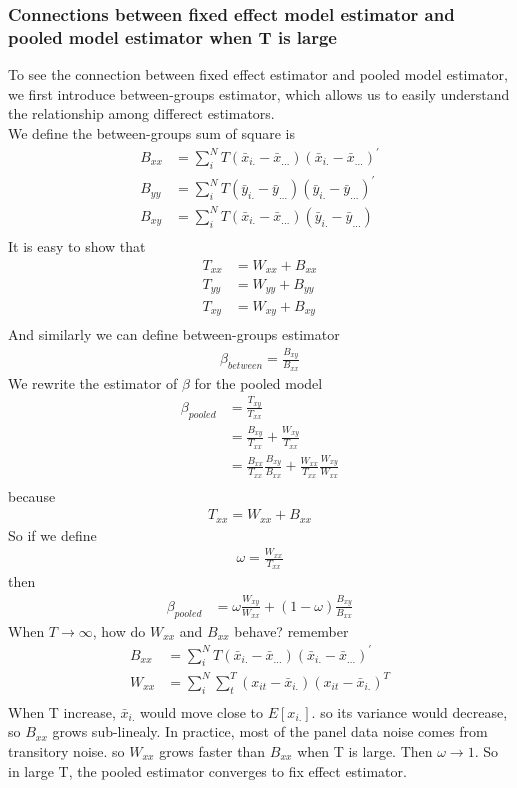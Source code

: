 \documentclass[a4paper]{article}
\begin{document}
\subsubsection {Connections between fixed effect model estimator and pooled model estimator when T is large}
To see the connection between fixed effect estimator and pooled model estimator, we first introduce between-groups estimator, which allows us to easily understand the relationship among differect estimators.\\
We define the between-groups sum of square is
\begin{align*}
B_{xx} & = \sum_i^NT(\bar x_{i.}-\bar x_{...})(\bar x_{i.}-\bar x_{...})^{'} \\
B_{yy} &= \sum_i^NT(\bar y_{i.}-\bar y_{...})(\bar y_{i.}-\bar y_{...})^{'}\\
B_{xy} &= \sum_i^NT(\bar x_{i.}-\bar x_{...})(\bar y_{i.}-\bar y_{...})\\
\end{align*}
It is easy to show that 
\begin{align*}
T_{xx} &= W_{xx} + B_{xx} \\
T_{yy} &= W_{yy} + B_{yy} \\
T_{xy} &= W_{xy} + B_{xy} \\
\end{align*}
And similarly we can define between-groups estimator
\begin{align*}
\beta_{between} = \frac{B_{xy}}{B_{xx}}
\end{align*}
We rewrite the  estimator of $\beta$ for the pooled model 
\begin{align*}
\beta_{pooled} & = \frac{T_{xy}}{T_{xx}} \\
                      & = \frac{B_{xy}}{T_{xx}} + \frac{W_{xy}}{T_{xx}}\\
                      & = \frac{B_{xx}}{T_{xx}}\frac{B_{xy}}{B_{xx}}  +  \frac{W_{xx}}{T_{xx}} \frac{W_{xy}}{W_{xx}} \\
\end{align*}
because
\begin{align*}
T_{xx} = W_{xx} + B_{xx}
\end{align*}
So if we define 
\begin{align*}
\omega = \frac{W_{xx}}{T_{xx}}
\end{align*}
then 
\begin{align*}
\beta_{pooled} & = \omega \frac{W_{xy}}{W_{xx}}+ (1 - \omega) \frac {B_{xy}}{B_{xx}} 
\end{align*}
When $T \rightarrow \infty$, how do $W_{xx}$ and $B_{xx}$ behave? remember
\begin{align*}
B_{xx} & = \sum_i^NT(\bar x_{i.}-\bar x_{...})(\bar x_{i.}-\bar x_{...})^{'} \\
W_{xx} &= \sum_i^N\sum_t^T(x_{it}-\bar x_{i.})(x_{it}- \bar x_{i.})^T\\
\end{align*} 
When T increase, $\bar x_{i.}$ would move close to $E[x_{i.}]$. so its variance would decrease, so $B_{xx}$ grows sub-linealy. In practice, most of the panel data noise comes from transitory noise. so $W_{xx}$ grows faster than $B_{xx}$ when T is large. Then $\omega \rightarrow 1$. So in large T, the pooled estimator converges to fix effect estimator.\\
\end{document}
